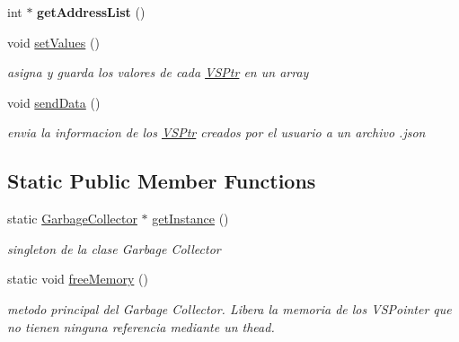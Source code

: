 \begin{DoxyCompactItemize}
\mbox{\label{classGarbageCollector_ac6d9b246803af79bbacf67c562ed0c44}} 
int $\ast$ {\bfseries get\+Address\+List} ()
\item 
\mbox{\label{classGarbageCollector_ab9695e995e50172ba4d4c21a9c17e841}} 
void \hyperlink{classGarbageCollector_ab9695e995e50172ba4d4c21a9c17e841}{set\+Values} ()
\begin{DoxyCompactList}\small\item\em asigna y guarda los valores de cada \hyperlink{classVSPtr}{V\+S\+Ptr} en un array \end{DoxyCompactList}\item 
\mbox{\label{classGarbageCollector_ac66057f60dcabda9c78f88de90863729}} 
void \hyperlink{classGarbageCollector_ac66057f60dcabda9c78f88de90863729}{send\+Data} ()
\begin{DoxyCompactList}\small\item\em envia la informacion de los \hyperlink{classVSPtr}{V\+S\+Ptr} creados por el usuario a un archivo .json \end{DoxyCompactList}\end{DoxyCompactItemize}
\subsection*{Static Public Member Functions}
\begin{DoxyCompactItemize}
\item 
static \hyperlink{classGarbageCollector}{Garbage\+Collector} $\ast$ \hyperlink{classGarbageCollector_ade4bccdf41223cc395b646db3f60ac8b}{get\+Instance} ()
\begin{DoxyCompactList}\small\item\em singleton de la clase Garbage Collector \end{DoxyCompactList}\item 
\mbox{\label{classGarbageCollector_ae980dc185c172fa0e408f82d79c1fca3}} 
static void \hyperlink{classGarbageCollector_ae980dc185c172fa0e408f82d79c1fca3}{free\+Memory} ()
\begin{DoxyCompactList}\small\item\em metodo principal del Garbage Collector. Libera la memoria de los V\+S\+Pointer que no tienen ninguna referencia mediante un thead. \end{DoxyCompactList}\end{DoxyCompactItemize}
